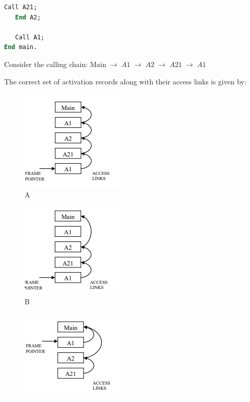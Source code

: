 \documentclass[journal]{IEEEtran}
\numberwithin{equation}{enumi}
\numberwithin{figure}{enumi}
\begin{document}
\begin{enumerate}
\begin{lstlisting}[language=Pascal]
      Call A21;
   End A2;

   Call A1;
End main.
\end{lstlisting}

Consider the calling chain:  
$
\text{Main} \;\rightarrow\; A1 \;\rightarrow\; A2 \;\rightarrow\; A21 \;\rightarrow\; A1
$

The correct set of activation records along with their access links is given by:
\begin{enumerate}
\begin{multicols}{2}
    \item 
    \begin{figure}[H]
    \centering
    \includegraphics[width=0.5\columnwidth]{figs/New folder (2)/fig8.png}
    \caption{A}
    \label{fig:8}
   \end{figure}
   \item \begin{figure}[H]
    \centering
    \includegraphics[width=0.5\columnwidth]{figs/New folder (2)/fig9.png}
    \caption{B}
    \label{fig:9}
   \end{figure}
   \item \begin{figure}[H]
    \centering
    \includegraphics[width=0.5\columnwidth]{figs/New folder (2)/fig10.png}

\end{figure}
\end{multicols}
\end{enumerate}
\end{enumerate}
\end{document}
